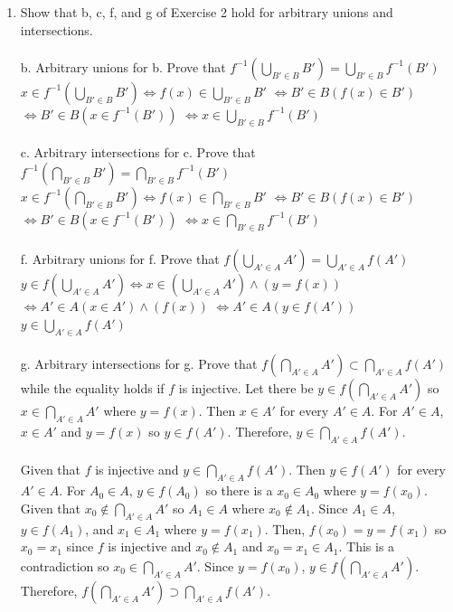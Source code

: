 \documentclass[]{article}
\begin{document}
\begin{enumerate}
    \item Show that b, c, f, and g of Exercise 2 hold for arbitrary unions and intersections.
    \\\\b. Arbitrary unions for b. Prove that $f^{-1}(\bigcup_{B' \in B} B') = \bigcup_{B' \in B} f^{-1}(B')$
    \newline $x \in f^{-1}(\bigcup_{B' \in B} B') \iff f(x) \in \bigcup_{B' \in B} B'$
    \newline $\iff B' \in B(f(x) \in B')$
    \newline $\iff B' \in B(x \in f^{-1}(B'))$
    \newline $\iff x \in \bigcup_{B' \in B} f^{-1}(B')$
    \\\\c. Arbitrary intersections for c. Prove that $f^{-1}(\bigcap_{B' \in B} B') = \bigcap_{B' \in B} f^{-1}(B')$
    \newline $x \in f^{-1}(\bigcap_{B' \in B}B') \iff f(x) \in \bigcap_{B' \in B}B'$
    \newline $\iff B' \in B(f(x) \in B')$
    \newline $\iff B' \in B(x \in f^{-1}(B'))$
    \newline $\iff x \in \bigcap_{B' \in B}f^{-1}(B')$
    \\\\f. Arbitrary unions for f. Prove that $f(\bigcup_{A' \in A} A') = \bigcup_{A' \in A}f(A')$
    \newline $y \in f(\bigcup_{A' \in A} A') \iff x \in (\bigcup_{A' \in A}A') \land (y=f(x))$
    \newline $\iff A' \in A(x \in A') \land (f(x))$
    \newline $\iff A' \in A (y \in f(A'))$
    \newline $y \in \bigcup_{A' \in A}f(A')$
    \\\\g. Arbitrary intersections for g. Prove that $f(\bigcap_{A' \in A}A') \subset \bigcap_{A' \in A} f(A')$ while the equality holds if $f$ is injective.
    \newline Let there be $y \in f(\bigcap_{A' \in A} A')$ so $x \in \bigcap_{A' \in A}A'$ where $y=f(x)$. Then $x \in A'$ for every $A' \in A$. For $A' \in A$, $x \in A'$ and $y=f(x)$ so $y \in f(A')$. Therefore, $y \in \bigcap_{A' \in A}f(A')$.
    \\\\ Given that $f$ is injective and $y \in \bigcap_{A' \in A}f(A')$. Then $y \in f(A')$ for every $A' \in A$. For $A_0 \in A$, $y \in f(A_0)$ so there is a $x_0 \in A_0$ where $y=f(x_0)$. Given that $x_0 \notin \bigcap_{A' \in A}A'$ so $A_1 \in A$ where $x_0 \notin A_1$. Since $A_1 \in A$, $y \in f(A_1)$, and $x_1 \in A_1$ where $y=f(x_1)$. Then, $f(x_0)=y=f(x_1)$ so $x_0=x_1$ since $f$ is injective and $x_0 \notin A_1$ and $x_0=x_1 \in A_1$. This is a contradiction so $x_0 \in \bigcap_{A' \in A} A'$. Since $y=f(x_0)$, $y \in f(\bigcap_{A' \in A}A')$. Therefore, $f(\bigcap_{A' \in A} A') \supset \bigcap_{A' \in A}f(A')$. 
    

\end{enumerate}
\end{document}
